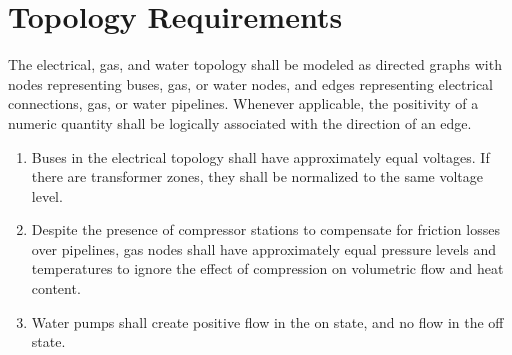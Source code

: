 \section{Topology Requirements}
The electrical, gas, and water topology shall be modeled as directed graphs with
nodes representing buses, gas, or water nodes, and edges representing electrical
connections, gas, or water pipelines. Whenever applicable, the positivity of a
numeric quantity shall be logically associated with the direction of an edge.

\begin{enumerate}
\item Buses in the electrical topology shall have approximately equal
  voltages. If there are transformer zones, they shall be normalized to the same
  voltage level.

\item Despite the presence of compressor stations to compensate for friction
  losses over pipelines, gas nodes shall have approximately equal pressure
  levels and temperatures to ignore the effect of compression on volumetric flow
  and heat content.

\item Water pumps shall create positive flow in the on state, and no flow in the
  off state.
\end{enumerate}
